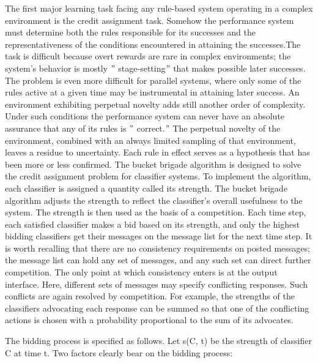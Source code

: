 \documentclass[12pt]{article}
\renewcommand{\_}{\kern-1.5pt\textunderscore\kern-1.5pt}
\begin{document}
The first major learning task facing any rule-based system operating in a complex environment is the credit assignment task. Somehow the performance system must determine both the rules responsible for its successes and the representativeness of the conditions encountered in attaining the successes.The task is difficult because overt rewards are rare in complex environments; the system’s behavior is mostly $"$ stage-setting$"$  that makes possible later successes. The problem is even more difficult for parallel systems, where only some of the rules active at a given time may be instrumental in attaining later success. An environment exhibiting perpetual novelty adds still another order of complexity. Under such conditions the performance system can never have an absolute assurance that any of its rules is $"$ correct.$"$  The perpetual novelty of the environment, combined with an always limited sampling of that environment, leaves a residue to uncertainty. Each rule in effect serves as a hypothesis that has been more or less confirmed. The bucket brigade algorithm is designed to solve the credit assignment problem for classifier systems. To implement the algorithm, each classifier is assigned a quantity called its strength. The bucket brigade algorithm adjusts the strength to reflect the classifier’s overall usefulness to the system. The strength is then used as the basis of a competition. Each time step, each satisfied classifier makes a bid based on its strength, and only the highest bidding classifiers get their messages on the message list for the next time step. It is worth recalling that there are no consistency requirements on posted messages; the message list can hold any set of messages, and any such set can direct further competition. The only point at which consistency enters is at the output interface. Here, different sets of messages may specify conflicting responses. Such conflicts are again resolved by competition. For example, the strengths of the classifiers advocating each response can be summed so that one of the conflicting actions is chosen with a probability proportional to the sum of its advocates. \par


\vspace{\baselineskip}

\vspace{\baselineskip}
The bidding process is specified as follows. Let s(C, t) be the strength of classifier C at time t. Two factors clearly bear on the bidding process: \par
\end{document}
